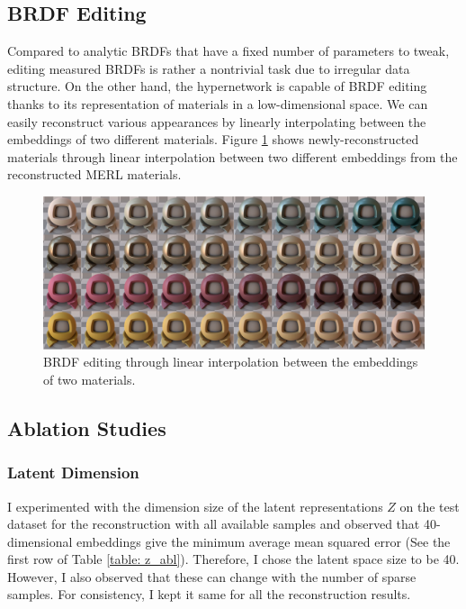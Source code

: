\subsection{BRDF Editing}\label{sec:brdf-editing}

Compared to analytic BRDFs that have a fixed number of parameters to tweak, editing measured BRDFs is rather a nontrivial task due to irregular data structure. On the other hand, the hypernetwork is capable of BRDF editing thanks to its representation of materials in a low-dimensional space. We can easily reconstruct various appearances by linearly interpolating between the embeddings of two different materials. Figure \ref{fig:interpolation} shows newly-reconstructed materials through linear interpolation between two different embeddings from the reconstructed MERL materials. 


\begin{figure}[ht]
  \centering
   \includegraphics[width=0.9\linewidth]{Chapters/hyperbrdf-figs/interpolation_extended.pdf}

   \caption{BRDF editing through linear interpolation between the embeddings of two materials.}
   \label{fig:interpolation}
\end{figure}

\subsection{Ablation Studies}\label{sec:abl}
\subsubsection{Latent Dimension}
I experimented with the dimension size of the latent representations $Z$ on the test dataset for the reconstruction with all available samples and observed that 40-dimensional embeddings give the minimum average mean squared error (See the first row of Table \ref{table: z_abl}). Therefore, I chose the latent space size to be 40. However, I also observed that these can change with the number of sparse samples. For consistency, I kept it same for all the reconstruction results. 

